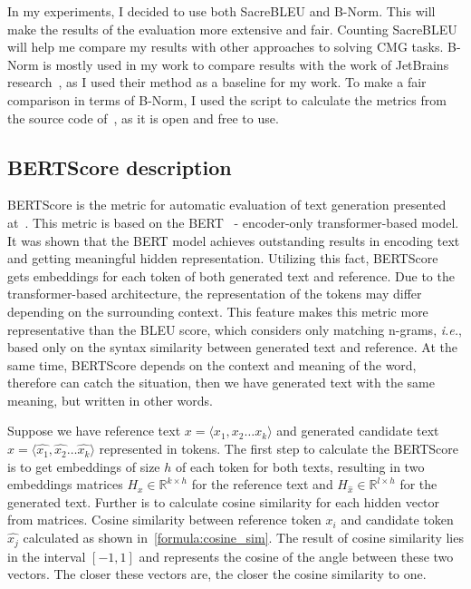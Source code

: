 In my experiments, I decided to use both SacreBLEU and B-Norm. This will make the results of the evaluation more extensive and fair. Counting SacreBLEU will help me compare my results with other approaches to solving CMG tasks. B-Norm is mostly used in my work to compare results with the work of JetBrains research~\cite{eliseeva2023commit}, as I used their method as a baseline for my work. To make a fair comparison in terms of B-Norm, I used the script to calculate the metrics from the source code of~\cite{eliseeva2023commit}, as it is open and free to use.

\subsection{BERTScore description}\label{subec:bertscore}
BERTScore is the metric for automatic evaluation of text generation presented at~\cite{zhang2019bertscore}. This metric is based on the BERT~\cite{devlin2018bert} {-} encoder-only transformer-based model. It was shown that the BERT model achieves outstanding results in encoding text and getting meaningful hidden representation. Utilizing this fact, BERTScore gets embeddings for each token of both generated text and reference. Due to the transformer-based architecture, the representation of the tokens may differ depending on the surrounding context. This feature makes this metric more representative than the BLEU score, which considers only matching n-grams, \textit{i.e.}, based only on the syntax similarity between generated text and reference. At the same time, BERTScore depends on the context and meaning of the word, therefore can catch the situation, then we have generated text with the same meaning, but written in other words.

Suppose we have reference text $x = \langle x_1, x_2 \dots x_k \rangle$ and generated candidate text $\hat{x} = \langle \hat{x_1}, \hat{x_2} \dots \hat{x_k} \rangle$ represented in tokens. The first step to calculate the BERTScore is to get embeddings of size $h$ of each token for both texts, resulting in two embeddings matrices $H_x \in \mathbb{R}^{k \times h}$ for the reference text and $H_{\hat{x}} \in \mathbb{R}^{l \times h}$ for the generated text. Further is to calculate cosine similarity for each hidden vector from matrices. Cosine similarity between reference token $x_i$ and candidate token $\hat{x_j}$ calculated as shown in~\ref{formula:cosine_sim}. The result of cosine similarity lies in the interval $[-1, 1]$ and represents the cosine of the angle between these two vectors. The closer these vectors are, the closer the cosine similarity to one.


